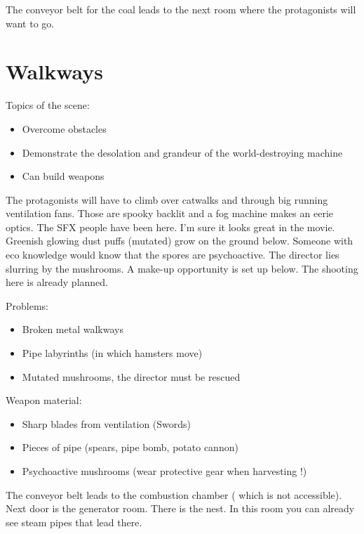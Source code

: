 The conveyor belt for the coal leads to the next room where the protagonists will want to go.


\section{Walkways}

Topics of the scene:
\begin{itemize}
\item Overcome obstacles
\item Demonstrate the desolation and grandeur of the world-destroying machine
\item Can build weapons
\end{itemize}

The protagonists will have to climb over catwalks and through big running ventilation fans.
Those are spooky backlit and a fog machine makes an eerie optics. The SFX people have been here. I'm sure it looks great in the movie.
Greenish glowing dust puffs (mutated) grow on the ground below. Someone with eco knowledge would know that the spores are psychoactive. The director lies slurring by the mushrooms.
A make-up opportunity is set up below. The shooting here is already planned.

Problems:
\begin{itemize}
\item Broken metal walkways
\item Pipe labyrinths (in which hamsters move)
\item Mutated mushrooms, the director must be rescued 
\end{itemize}

Weapon material:

\begin{itemize}
\item Sharp blades from ventilation (Swords)
\item Pieces of pipe (spears, pipe bomb, potato cannon)
\item Psychoactive mushrooms (wear protective gear when harvesting !)
\end{itemize}


The conveyor belt leads to the combustion chamber ( which is not accessible). Next door is the generator room. There is the nest.
In this room you can already see steam pipes that lead there.

